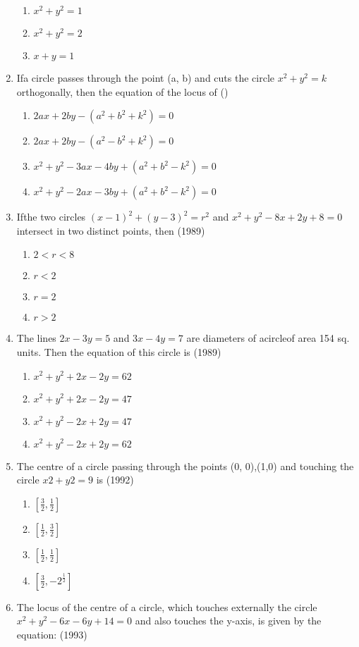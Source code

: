 \documentclass[12pt]{article}
\providecommand{\sbrak}[1]{\ensuremath{{}\left[#1\right]}}
\begin{document}
\begin{enumerate}
\begin{enumerate}
\item $x^2+y^2=1$
\item $x^2+y^2=2$
\item $x+y=1$
\end{enumerate}
\item  Ifa circle passes through the point (a, b) and cuts the circle $x^2+y^2=k$ orthogonally, then the equation of the locus of ()
\begin{enumerate}
\item $2ax+2by-(a^2+b^2+k^2)=0$
\item $2ax+2by-(a^2-b^2+k^2)=0$
\item $x^2+y^2-3ax-4by+(a^2+b^2-k^2)=0$
\item $x^2+y^2-2ax-3by+(a^2+b^2-k^2)=0$
\end{enumerate}
\item Ifthe two circles $(x- 1)^2+(y-3)^2=r^2$ and $x^2+y^2-8x+2y+8=0$ intersect in two distinct points, then (1989)
\begin{enumerate}
\item $2<r<8$
\item $r<2$
\item $r=2$
\item $r>2$
\end{enumerate}
\item The lines $2x-3y=5$ and $3x-4y=7$ are diameters of acircleof area 154 sq. units. Then the equation of this circle is (1989)
\begin{enumerate}
\item $x^2+y^2+2x-2y=62$
\item $x^2+y^2+2x-2y=47$
\item $x^2+y^2-2x+2y=47$
\item $x^2+y^2-2x+2y=62$
\end{enumerate}
\item The centre of a circle passing through the points (0, 0),(1,0) and touching the circle $x2+y2=9$ is (1992)
\begin{enumerate}
\item $\sbrak{\frac{3}{2},\frac{1}{2}}$
\item $\sbrak{\frac{1}{2},\frac{3}{2}}$
\item $\sbrak{\frac{1}{2},\frac{1}{2}}$
\item $\sbrak{\frac{3}{2},-2^\frac{1}{2}}$
\end{enumerate}
\item The locus of the centre of a circle, which touches externally the circle $x^2+y^2-6x-6y+14=0$ and also touches the y-axis, is given by the equation: (1993)

\end{enumerate}
\end{document}
